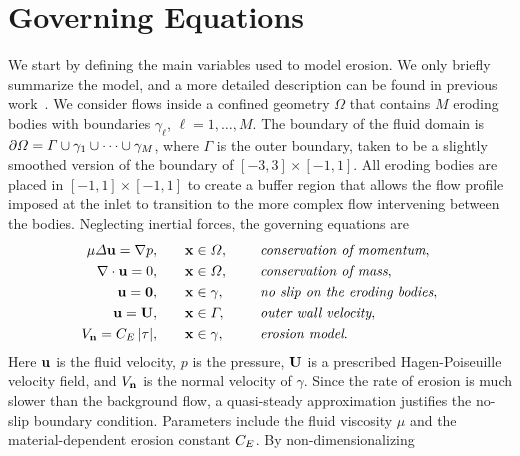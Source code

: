 \documentclass{jfm}
\begin{document}
\section{Governing Equations}
\label{sec:formulation}
We start by defining the main variables used to model erosion.  We only
briefly summarize the model, and a more detailed description can be
found in previous work~\citep{qua-moo2018}.  We consider flows inside a
confined geometry $\Omega$ that contains $M$ eroding bodies with
boundaries $\gamma_\ell$, $\ell = 1,\ldots,M$.  The boundary of the
fluid domain is ${\partial} \varOmega = \varGamma \cup \gamma_1 \cup \cdots \cup
\gamma_M$, where $\Gamma$ is the outer boundary, taken to be a slightly
smoothed version of the boundary of $[-3,3] \times [-1,1]$.  All eroding
bodies are placed in $[-1,1] \times [-1,1]$ to create a buffer region
that allows the flow profile imposed at the inlet to transition to the
more complex flow intervening between the bodies. Neglecting inertial
forces, the governing equations are
\begin{equation}
\label{eqn:erosionModel}
  \begin{split}
    \mu \varDelta {\mathbf{u}} = {\nabla} p, &\hspace{20pt} {\mathbf{x}} \in \varOmega, \hspace*{.2in} 
      &&\mbox{\em conservation of momentum}, \\
    {\nabla} \cdot {\mathbf{u}} = 0, &\hspace{20pt} {\mathbf{x}} \in \varOmega, \hspace*{.2in} 
      &&\mbox{\em conservation of mass}, \\
    {\mathbf{u}} = \mathbf{0}, &\hspace{20pt} {\mathbf{x}} \in \gamma, \hspace*{.2in} 
      &&\mbox{\em no slip on the eroding bodies}, \\
    {\mathbf{u}} = {\mathbf{U}}, &\hspace{20pt} {\mathbf{x}} \in \varGamma, \hspace*{.2in} 
      &&\mbox{\em outer wall velocity}, \\
    V_{\mathbf{n}} = C_E \, \lvert \tau \rvert, &\hspace{20pt} {\mathbf{x}} \in \gamma,
      &&\mbox{\em erosion model}.
  \end{split}
\end{equation}
Here ${\mathbf{u}}$ is the fluid velocity, $p$ is the pressure, ${\mathbf{U}}$ is a
prescribed Hagen-Poiseuille velocity field, and $V_{\mathbf{n}}$ is the normal
velocity of $\gamma$. Since the rate of erosion is much slower than the
background flow, a quasi-steady approximation justifies the no-slip
boundary condition. Parameters include the fluid viscosity $\mu$ and the
material-dependent erosion constant $C_E$. By non-dimensionalizing
\end{document}
